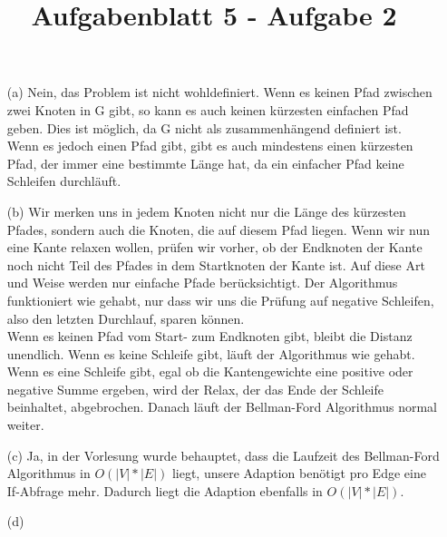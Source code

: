 \documentclass{article}
\title{Aufgabenblatt 5 - Aufgabe 2}
\author{}
\begin{document}
\maketitle
\begin{enumerate}
\item[(a)]
Nein, das Problem ist nicht wohldefiniert. Wenn es keinen Pfad zwischen zwei Knoten in G gibt, so kann es auch keinen kürzesten einfachen Pfad geben. Dies ist möglich, da G nicht als zusammenhängend definiert ist.\\
Wenn es jedoch einen Pfad gibt, gibt es auch mindestens einen kürzesten Pfad, der immer  eine bestimmte Länge hat, da ein einfacher Pfad keine Schleifen durchläuft. 
\item[(b)]
Wir merken uns in jedem Knoten nicht nur die Länge des kürzesten Pfades, sondern auch die Knoten, die auf diesem Pfad liegen. Wenn wir nun eine Kante relaxen wollen, prüfen wir vorher, ob der Endknoten der Kante noch nicht Teil des Pfades in dem Startknoten der Kante ist. Auf diese Art und Weise werden nur einfache Pfade berücksichtigt. Der Algorithmus funktioniert wie gehabt, nur dass wir uns die Prüfung auf negative Schleifen, also den letzten Durchlauf, sparen können. \\
Wenn es keinen Pfad vom Start- zum Endknoten gibt, bleibt die Distanz unendlich. Wenn es keine Schleife gibt, läuft der Algorithmus wie gehabt.\\
Wenn es eine Schleife gibt, egal ob die Kantengewichte eine positive oder negative Summe ergeben, wird der Relax, der das Ende der Schleife beinhaltet, abgebrochen. Danach läuft der Bellman-Ford Algorithmus normal weiter.
\item[(c)]
Ja, in der Vorlesung wurde behauptet, dass die Laufzeit des Bellman-Ford Algorithmus in $O(|V|*|E|)$ liegt, unsere Adaption benötigt pro Edge eine If-Abfrage mehr. Dadurch liegt die Adaption ebenfalls in $O(|V|*|E|)$. 
\item[(d)]

\end{enumerate}
\end{document}
